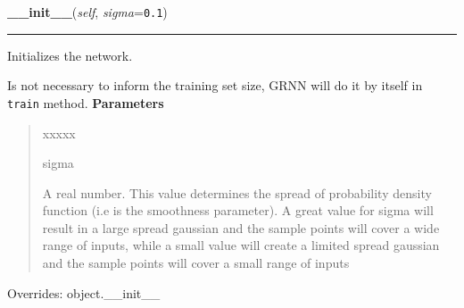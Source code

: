 \hspace{.8\funcindent}\begin{boxedminipage}{\funcwidth}

    \raggedright \textbf{\_\_init\_\_}(\textit{self}, \textit{sigma}={\tt 0.1})

    \vspace{-1.5ex}

    \rule{\textwidth}{0.5\fboxrule}
\setlength{\parskip}{2ex}

Initializes the network.

Is not necessary to inform the training set size, GRNN will do it by
itself in \texttt{train} method.
\setlength{\parskip}{1ex}
      \textbf{Parameters}
      \vspace{-1ex}

      \begin{quote}
        \begin{Ventry}{xxxxx}

          \item[sigma]


A real number. This value determines the spread of probability
density function (i.e is the smoothness parameter). A great value
for sigma will result in a large spread gaussian and the sample
points will cover a wide range of inputs, while a small value will
create a limited spread gaussian and the sample points will cover a
small range of inputs
        \end{Ventry}

      \end{quote}

      Overrides: object.\_\_init\_\_

    \end{boxedminipage}

    \label{peach:nn:nnet:GRNN:train}

    \vspace{0.5ex}

